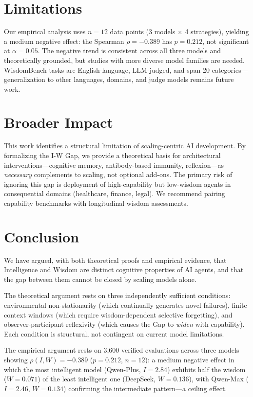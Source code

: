 \documentclass{article}
\begin{document}
\section{Limitations}

Our empirical analysis uses $n=12$ data points (3 models $\times$ 4 strategies),
yielding a medium negative effect: the Spearman $\rho=-0.389$ has $p=0.212$, not
significant at $\alpha=0.05$. The negative trend is consistent across all three
models and theoretically grounded, but studies with more diverse model families
are needed. WisdomBench tasks are English-language, LLM-judged, and span
20 categories---generalization to other languages, domains, and judge models
remains future work.

\section{Broader Impact}

This work identifies a structural limitation of scaling-centric AI development.
By formalizing the I-W Gap, we provide a theoretical basis for architectural
interventions---cognitive memory, antibody-based immunity, reflexion---as
\emph{necessary} complements to scaling, not optional add-ons.
The primary risk of ignoring this gap is deployment of high-capability but
low-wisdom agents in consequential domains (healthcare, finance, legal).
We recommend pairing capability benchmarks with longitudinal wisdom assessments.

\section{Conclusion}

We have argued, with both theoretical proofs and empirical evidence,
that Intelligence and Wisdom are distinct cognitive properties of AI
agents, and that the gap between them cannot be closed by scaling models
alone.

The theoretical argument rests on three independently sufficient
conditions: environmental non-stationarity (which continually generates
novel failures), finite context windows (which require wisdom-dependent
selective forgetting), and observer-participant reflexivity (which causes
the Gap to \emph{widen} with capability). Each condition is structural,
not contingent on current model limitations.

The empirical argument rests on 3,600 verified evaluations across
three models showing $\rho(I, W) = -0.389$ ($p = 0.212$, $n{=}12$):
a medium negative effect in which the most intelligent model (Qwen-Plus,
$I{=}2.84$) exhibits half the wisdom ($W{=}0.071$) of the least intelligent
one (DeepSeek, $W{=}0.136$), with Qwen-Max ($I{=}2.46$, $W{=}0.134$)
confirming the intermediate pattern---a ceiling effect.
\end{document}

